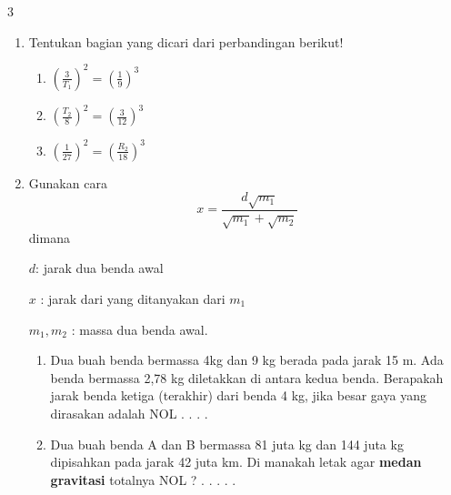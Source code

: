\documentclass[10pt,a4paper]{article}
\begin{document}
\begin{multicols*} {3} 
\newcommand{\tikzmark}[2]{\tikz[remember picture,baseline=(#1.base)]{\node[inner sep=0pt] (#1) {#2};}} 


\begin{enumerate}[itemsep=0mm]

\item Tentukan bagian yang dicari dari perbandingan berikut!
\begin{enumerate}[label=\alph*)]
\item $ \left(\frac{3}{T_1}\right)^2=\left(\frac{1}{9}\right)^3$
\item $\left(\frac{T_2}{8}\right)^2=\left(\frac{3}{12}\right)^3$
\item
$\left(\frac{1}{27} \right)^2=\left(\frac{R_2}{18}\right)^3$
\end{enumerate}

\item Gunakan cara $$ x=\frac{d\sqrt{m_1}}{\sqrt{m_1}+\sqrt{m_2}}$$ 
dimana

$d$: jarak dua benda awal 

$x$ : jarak dari yang ditanyakan dari $m_1$

$m_1, m_2$ : massa dua benda awal.
\begin{enumerate}[label=\alph*)]

\item Dua buah benda bermassa 4kg dan 9 kg berada pada jarak 15 m. Ada benda bermassa 2,78 kg diletakkan di antara kedua benda. Berapakah jarak benda ketiga (terakhir) dari benda 4 kg, jika besar gaya yang dirasakan adalah NOL . . . .
\item Dua buah benda A dan B bermassa 81 juta kg dan 144 juta kg dipisahkan pada jarak 42 juta km. Di manakah letak agar \textbf{medan gravitasi} totalnya NOL ? . . . . .
\end{enumerate}
\end{enumerate}   


\end{multicols*}
\end{document}
